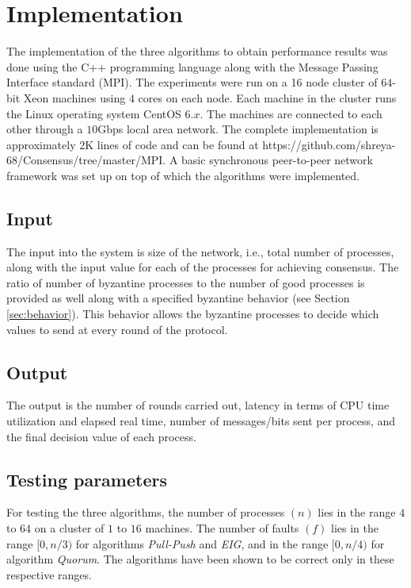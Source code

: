 ﻿\section{Implementation}
\label{sec:eval}

The implementation of the three algorithms to obtain performance results
was done using the C++ programming language along with the Message
Passing Interface standard (MPI).  The experiments were run on a 16 node
cluster of $64$-bit Xeon machines using $4$ cores on each node.
Each machine in the cluster runs the Linux operating system CentOS $6.x$.
The machines are connected to each other through a $10$Gbps local area
network. The complete implementation is approximately $2$K lines of code
and can be found at
https://github.com/shreya-68/Consensus/tree/master/MPI. A basic
synchronous peer-to-peer network framework was set up on top of which
the algorithms were implemented.

\subsection{Input}
The input into the system is size of the network, i.e., total number of processes, along with the input value for each of the processes for achieving consensus. The ratio of number of byzantine processes to the number of good processes is provided as well along with a specified byzantine behavior (see Section \ref{sec:behavior}). This behavior allows the byzantine processes to decide which values to send at every round of the protocol. 

\subsection{Output}
The output is the number of rounds carried out, latency in terms of CPU time utilization and elapsed real time, number of messages/bits sent per process, and the final decision value of each process. 

\subsection{Testing parameters}
For testing the three algorithms, the number of processes $(n)$ lies in the range $4$ to $64$ on a cluster of $1$ to $16$ machines. The number of faults $(f)$ lies in the range $[0, n/3)$ for algorithms \textit{Pull-Push} and \textit{EIG}, and in the range $[0, n/4)$ for algorithm \textit{Quorum}. The algorithms have been shown to be correct only in these respective ranges.

